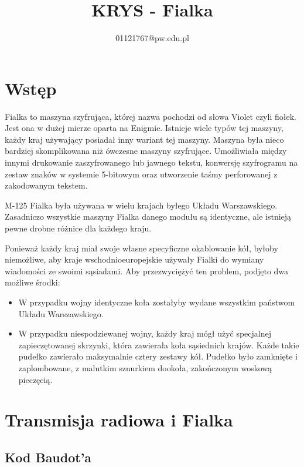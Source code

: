 \documentclass{article}
\title{KRYS - Fialka}
\author{01121767@pw.edu.pl}
\begin{document}
\maketitle

\section{Wstęp}

Fialka to maszyna szyfrująca, której nazwa pochodzi od słowa Violet czyli fiołek. Jest ona w dużej mierze oparta na Enigmie. Istnieje wiele typów tej maszyny, każdy kraj używający posiadał inny wariant tej maszyny. Maszyna była nieco bardziej skomplikowana niż ówczesne maszyny szyfrujące. Umożliwiała między innymi drukowanie zaszyfrowanego lub jawnego tekstu, konwersję szyfrogramu na zestaw znaków w systemie 5-bitowym oraz utworzenie taśmy perforowanej z zakodowanym tekstem. 

M-125 Fialka była używana w wielu krajach byłego Układu Warszawskiego. Zasadniczo wszystkie maszyny Fialka danego modułu są identyczne, ale istnieją pewne drobne różnice dla każdego kraju. 

Ponieważ każdy kraj miał swoje własne specyficzne okablowanie kół, byłoby niemożliwe, aby kraje wschodnioeuropejskie używały Fialki do wymiany wiadomości ze swoimi sąsiadami. Aby przezwyciężyć ten problem, podjęto dwa możliwe środki: 

\begin{itemize}
  \item W przypadku wojny identyczne koła zostałyby wydane wszystkim państwom Układu Warszawskiego. 
  \item W przypadku niespodziewanej wojny, każdy kraj mógł użyć specjalnej zapieczętowanej skrzynki, która zawierała koła sąsiednich krajów. Każde takie pudełko zawierało maksymalnie cztery zestawy kół. Pudełko było zamknięte i zaplombowane, z malutkim sznurkiem dookoła, zakończonym woskową pieczęcią.
\end{itemize}

\section{Transmisja radiowa i Fialka}

\subsection{Kod Baudot’a}
\end{document}
